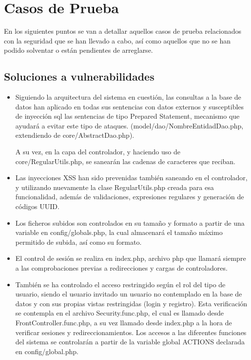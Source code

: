 \chapter{Casos de Prueba}

En los siguientes puntos se van a detallar aquellos casos de prueba relacionados con la seguridad que se han llevado a cabo, as\'{i} como aquellos que no se han podido solventar o est\'{a}n pendientes de arreglarse.

\section{Soluciones a vulnerabilidades}
\begin{itemize}


\item Siguiendo la arquitectura del sistema en cuesti\'{o}n, las consultas a la base de datos han aplicado en todas sus sentencias con datos externos y susceptibles de inyecci\'{o}n sql las sentencias de tipo Prepared Statement, mecanismo que ayudar\'{a} a evitar este tipo de ataques. (model/dao/NombreEntidadDao.php, extendiendo de core/AbstractDao.php).

A su vez, en la capa del controlador, y haciendo uso de core/RegularUtils.php, se sanear\'{a}n las cadenas de caracteres que reciban.

\item Las inyecciones XSS han sido prevenidas tambi\'{e}n saneando en el controlador, y utilizando nuevamente la clase RegularUtils.php creada para esa funcionalidad, adem\'{a}s de validaciones, expresiones regulares y generaci\'{o}n de c\'{o}digos UUID.

\item Los ficheros subidos son controlados en su tama\~{n}o y formato a partir de una variable en config/globals.php, la cual almacenar\'{a} el tama\~{n}o m\'{a}ximo permitido de subida, as\'{i} como su formato. 

\item El control de sesi\'{o}n se realiza en index.php, archivo php que llamar\'{a} siempre a las comprobaciones previas a redirecciones y cargas de controladores.

\item Tambi\'{e}n se ha controlado el acceso restringido seg\'{u}n el rol del tipo de usuario, siendo el usuario invitado un usuario no contemplado en la base de datos y con sus propias vistas restringidas (login y registro). Esta verificaci\'{o}n se contempla en el archivo Security.func.php, el cual es llamado desde FrontController.func.php, a su vez llamado desde index.php a la hora de verificar sesiones y redireccionamientos. Los accesos a las diferentes funciones del sistema se controlar\'{a}n a partir de la variable global ACTIONS declarada en config/global.php. 


\end{itemize}
